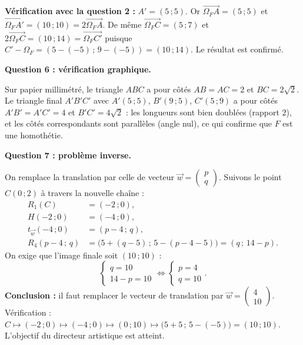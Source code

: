 \documentclass[11pt]{article}
\begin{document}
\begin{exoresolu}
\textbf{Vérification avec la question 2 :} $A' = (5\,;5)$. Or $\overrightarrow{\Omega_F A} = (5\,;5)$ et $\overrightarrow{\Omega_F A'} = (10\,;10) = 2\overrightarrow{\Omega_F A}$. De même $\overrightarrow{\Omega_F C} = (5\,;7)$ et $2\overrightarrow{\Omega_F C} = (10\,;14) = \overrightarrow{\Omega_F C'}$ puisque $C' - \Omega_F = (5-(-5)\,;\,9-(-5)) = (10\,;14)$. Le résultat est confirmé.

\textbf{Question 6 : vérification graphique.}

Sur papier millimétré, le triangle $ABC$ a pour côtés $AB = AC = 2$ et $BC = 2\sqrt{2}$. Le triangle final $A'B'C'$ avec $A'(5\,;5)$, $B'(9\,;5)$, $C'(5\,;9)$ a pour côtés $A'B' = A'C' = 4$ et $B'C' = 4\sqrt{2}$ : les longueurs sont bien doublées (rapport $2$), et les côtés correspondants sont parallèles (angle nul), ce qui confirme que $F$ est une homothétie.

\textbf{Question 7 : problème inverse.}

On remplace la translation par celle de vecteur $\vec{w} = \begin{pmatrix} p \\ q \end{pmatrix}$. Suivons le point $C(0\,;2)$ à travers la nouvelle chaîne :
\begin{align*}
R_1(C) &= (-2\,;0), \\
H(-2\,;0) &= (-4\,;0), \\
t_{\vec{w}}(-4\,;0) &= (p - 4\,;\,q), \\
R_4(p-4\,;\,q) &= \bigl(5 + (q - 5)\,;\,5 - (p - 4 - 5)\bigr) = (q\,;\,14 - p).
\end{align*}
On exige que l'image finale soit $(10\,;10)$ :
\[ \begin{cases} q = 10 \\ 14 - p = 10 \end{cases} \iff \begin{cases} p = 4 \\ q = 10 \end{cases}. \]
\textbf{Conclusion :} il faut remplacer le vecteur de translation par $\vec{w} = \begin{pmatrix} 4 \\ 10 \end{pmatrix}$. Vérification : $C \mapsto (-2\,;0) \mapsto (-4\,;0) \mapsto (0\,;10) \mapsto \bigl(5 + 5\,;\,5 - (-5)\bigr) = (10\,;10)$. L'objectif du directeur artistique est atteint.
\end{exoresolu}
\end{document}
